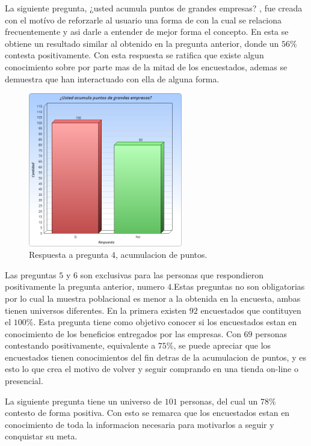 La siguiente pregunta, ¿usted acumula puntos de grandes empresas? , fue creada con el motívo de 
reforzarle al usuario una forma de {\GAM} con la cual se relaciona frecuentemente y asi darle
a entender de mejor forma el concepto. En esta se obtiene un resultado similar al obtenido en 
la pregunta anterior, donde un $56\%$ contesta positivamente. Con esta respuesta se ratifica que existe
algun conocimiento sobre {\GAM} por parte mas de la mitad de los encuestados, ademas se demuestra que
han interactuado con ella de alguna forma.

\begin{figure}[!htb]
  \centering
  \includegraphics[width=0.6\textwidth]{images/Graficos/graf_5_2.png}
  \caption[chart5.2]{Respuesta a pregunta $4$, acumulacion de puntos.}
  \label{fig:chart5.2}
\end{figure}

Las preguntas $5$ y $6$ son exclusivas para las personas que respondieron positivamente la
pregunta anterior, numero $4$.Estas preguntas no son obligatorias por lo cual la muestra poblacional
es menor a la obtenida en la encuesta, ambas tienen universos diferentes.
En la primera existen $92$ encuestados que contituyen el $100\%$. Esta pregunta tiene como objetivo 
conocer si los encuestados estan en conocimiento de los beneficios entregados por las empresas.  
Con $69$ personas contestando positivamente, equivalente a $75\%$, se puede apreciar que los 
encuestados tienen conocimientos del fin detras de la acumulacion de puntos, y es esto lo que
crea el motivo de volver y seguir comprando en una tienda on-line o presencial.

La siguiente pregunta tiene un universo de $101$ personas, del cual un $78\%$ contesto de forma positiva.
Con esto se remarca que los encuestados estan en conocimiento de toda la informacion necesaria 
para motivarlos a seguir y conquistar su meta.

